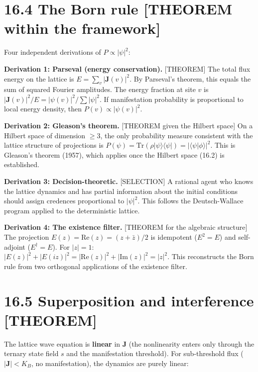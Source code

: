 \documentclass[
  11pt,
  letterpaper,
  twoside,
  openright]{book}
\begin{document}
\section{16.4 The Born rule {[}THEOREM within the
framework{]}}\label{the-born-rule-theorem-within-the-framework}

Four independent derivations of \(P \propto |\psi|^2\):

\textbf{Derivation 1: Parseval (energy conservation).} {[}THEOREM{]} The
total flux energy on the lattice is \(E = \sum_v |\mathbf{J}(v)|^2\). By
Parseval's theorem, this equals the sum of squared Fourier amplitudes.
The energy fraction at site \(v\) is
\(|\mathbf{J}(v)|^2 / E = |\psi(v)|^2 / \sum |\psi|^2\). If
manifestation probability is proportional to local energy density, then
\(P(v) \propto |\psi(v)|^2\).

\textbf{Derivation 2: Gleason's theorem.} {[}THEOREM given the Hilbert
space{]} On a Hilbert space of dimension \(\geq 3\), the only
probability measure consistent with the lattice structure of projections
is
\(P(\psi) = \text{Tr}(\rho |\psi\rangle\langle\psi|) = |\langle\psi|\phi\rangle|^2\).
This is Gleason's theorem (1957), which applies once the Hilbert space
(16.2) is established.

\textbf{Derivation 3: Decision-theoretic.} {[}SELECTION{]} A rational
agent who knows the lattice dynamics and has partial information about
the initial conditions should assign credences proportional to
\(|\psi|^2\). This follows the Deutsch-Wallace program applied to the
deterministic lattice.

\textbf{Derivation 4: The existence filter.} {[}THEOREM for the
algebraic structure{]} The projection
\(E(z) = \text{Re}(z) = (z + \bar{z})/2\) is idempotent (\(E^2 = E\))
and self-adjoint (\(E^\dagger = E\)). For \(|z| = 1\):
\(|E(z)|^2 + |E(iz)|^2 = |\text{Re}(z)|^2 + |\text{Im}(z)|^2 = |z|^2\).
This reconstructs the Born rule from two orthogonal applications of the
existence filter.

\section{16.5 Superposition and interference
{[}THEOREM{]}}\label{superposition-and-interference-theorem}

The lattice wave equation is \textbf{linear} in \(\mathbf{J}\) (the
nonlinearity enters only through the ternary state field \(s\) and the
manifestation threshold). For sub-threshold flux
(\(|\mathbf{J}| < K_B\), no manifestation), the dynamics are purely
linear:
\end{document}
